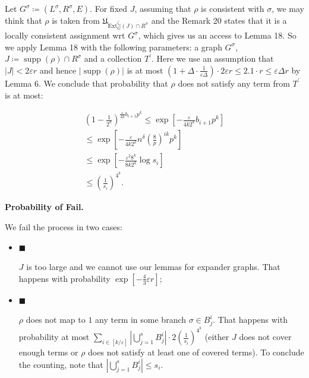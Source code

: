 \documentclass[10pt,a4paper]{article}
\begin{document}
Let $G^{\sigma}\coloneqq(L^{\sigma},R^{\sigma},E)$. For fixed $J$, assuming that $\rho$ is consistent
with $\sigma$, we may think that $\rho$ is taken from
$\mathfrak{U}_{\mathrm{Ext}_{G}^{\zeta_{2}}\left(J\right)\cap R^{\sigma}}$ and the Remark 20 states that it is a
locally consistent assignment wrt $G^{\sigma}$, which gives us an access to Lemma
18. So we apply Lemma 18 with the following parameters: a
graph $G^{\sigma}$, $J\coloneqq\operatorname*{supp}(\rho)\cap R^{\sigma}$ and a collection $T^{\prime}$. Here we use an
assumption that $|J|<2\varepsilon r$ and hence $|\operatorname*{supp}(\rho)|$ is at most $\left(1+\Delta\cdot\frac{1}{\varepsilon\Delta}\right)\cdot 2\varepsilon r\leq 2%
.1\cdot r\leq\varepsilon\Delta r$ by Lemma 6. We conclude that probability that $\rho$ does not satisfy any
term from $T^{\prime}$ is at most:\par


\[\begin{gathered}
\displaystyle\left(1-\frac{1}{2^{k}}\right)^{\frac{\varepsilon}{4k}b_{i+1}p^{k}} \displaystyle\leq\exp\left[-\frac{\varepsilon}{4k2^{k}}b_{i+1}p^{k}\right] \\
\displaystyle\leq\exp\left[-\frac{\varepsilon}{4k2^{k}}n^{\delta}\left(\frac{8%
}{p}\right)^{ik}p^{k}\right] \\
\displaystyle\leq\exp\left[-\frac{\varepsilon^{2}8^{k}}{8k2^{k}}\log s_{i}\right] \\
\displaystyle\leq\left(\frac{1}{s_{i}}\right)^{4^{k}}.
\end{gathered}\]





\par\medskip\noindent\textbf{Probability of Fail.}\par




We fail the process in two cases:\par


\begin{itemize}


\item[] 
$\blacksquare$ 


$J$ is too large and we cannot use our lemmas for expander graphs. That happens with
probability $\exp\left[-\frac{4}{3}\varepsilon r\right]$;\par





\item[] 
$\blacksquare$ 


$\rho$ does not map to $1$ any term in some branch $\sigma\in B^{i}_{j}$. That happens with
probability at most $\sum\limits_{i\in[k/\varepsilon]}|\bigcup\limits_{j=1}^{s}B^{i}_{j}|\cdot 2%
\left(\frac{1}{s_{i}}\right)^{4^{k}}$ (either $J$ does not cover enough terms or $\rho$
does not satisfy at least one of covered terms). To conclude the counting, note that $\left|\bigcup\limits_{j=1}^{s}B^{i}_{j}\right|\leq s_{i}$.\par





\end{itemize}
\end{document}

